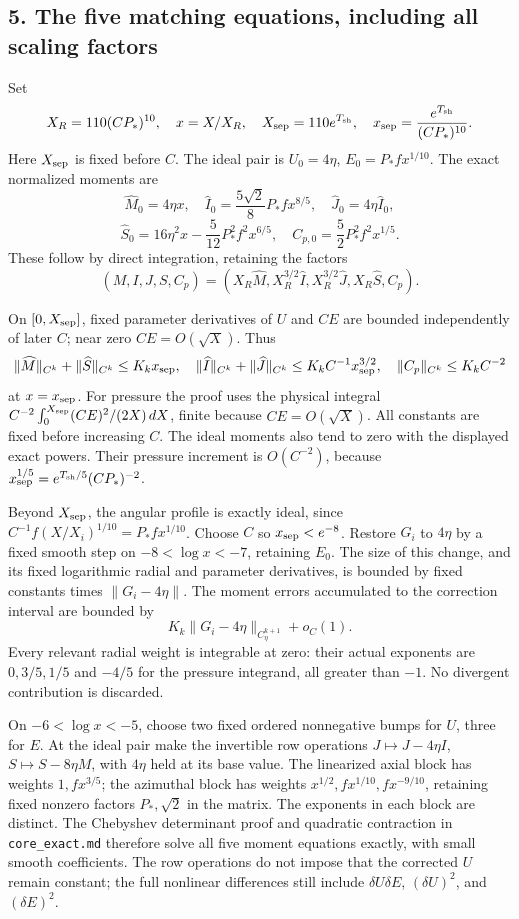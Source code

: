 \documentclass[10pt,a4paper]{article}
\begin{document}
\subsection{5. The five matching equations, including all scaling factors}

Set
\[
X_R=110(CP_*)^{10},\quad x=X/X_R,\quad
X_{\rm sep}=110e^{T_{\rm sh}},\quad
x_{\rm sep}=\frac{e^{T_{\rm sh}}}{(CP_*)^{10}}.
\]
Here \(X_{\rm sep}\) is fixed before \(C\). The ideal pair is \(U_0=4\eta\), \(E_0=P_*fx^{1/10}\). The exact normalized moments are
\[
\widehat M_0=4\eta x,\quad\widehat I_0=\frac{5\sqrt2}{8}P_*fx^{8/5},
\quad\widehat J_0=4\eta\widehat I_0,
\]
\[
\widehat S_0=16\eta^2x-\frac5{12}P_*^2f^2x^{6/5},
\quad C_{p,0}=\frac52P_*^2f^2x^{1/5}.
\]
These follow by direct integration, retaining the factors
\[
(M,I,J,S,C_p)=(X_R\widehat M,X_R^{3/2}\widehat I,
X_R^{3/2}\widehat J,X_R\widehat S,C_p).
\]

On \([0,X_{\rm sep}]\), fixed parameter derivatives of \(U\) and \(CE\) are bounded independently of later \(C\); near zero \(CE=O(\sqrt X)\). Thus
\[
\|\widehat M\|_{C^k}+\|\widehat S\|_{C^k}\le K_kx_{\rm sep},
\quad\|\widehat I\|_{C^k}+\|\widehat J\|_{C^k}
\le K_kC^{-1}x_{\rm sep}^{3/2},
\quad\|C_p\|_{C^k}\le K_kC^{-2}
\]
at \(x=x_{\rm sep}\). For pressure the proof uses the physical integral \(C^{-2}\int_0^{X_{\rm sep}}(CE)^2/(2X)\,dX\), finite because \(CE=O(\sqrt X)\). All constants are fixed before increasing \(C\). The ideal moments also tend to zero with the displayed exact powers. Their pressure increment is \(O(C^{-2})\), because \(x_{\rm sep}^{1/5}=e^{T_{\rm sh}/5}(CP_*)^{-2}\).

Beyond \(X_{\rm sep}\), the angular profile is exactly ideal, since
\(C^{-1}f(X/X_i)^{1/10}=P_*fx^{1/10}\). Choose \(C\) so \(x_{\rm sep}<e^{-8}\). Restore \(G_i\) to \(4\eta\) by a fixed smooth step on \(-8<\log x<-7\), retaining \(E_0\). The size of this change, and its fixed logarithmic radial and parameter derivatives, is bounded by fixed constants times \(\|G_i-4\eta\|\). The moment errors accumulated to the correction interval are bounded by
\[
K_k\|G_i-4\eta\|_{C^{k+1}_\eta}+o_C(1).
\]
Every relevant radial weight is integrable at zero: their actual exponents are \(0,3/5,1/5\) and \(-4/5\) for the pressure integrand, all greater than \(-1\). No divergent contribution is discarded.

On \(-6<\log x<-5\), choose two fixed ordered nonnegative bumps for \(U\), three for \(E\). At the ideal pair make the invertible row operations \(J\mapsto J-4\eta I\), \(S\mapsto S-8\eta M\), with \(4\eta\) held at its base value. The linearized axial block has weights \(1,fx^{3/5}\); the azimuthal block has weights \(x^{1/2},fx^{1/10},fx^{-9/10}\), retaining fixed nonzero factors \(P_*,\sqrt2\) in the matrix. The exponents in each block are distinct. The Chebyshev determinant proof and quadratic contraction in \texttt{core\_exact.md} therefore solve all five moment equations exactly, with small smooth coefficients. The row operations do not impose that the corrected \(U\) remain constant; the full nonlinear differences still include \(\delta U\delta E\), \((\delta U)^2\), and \((\delta E)^2\).
\end{document}
